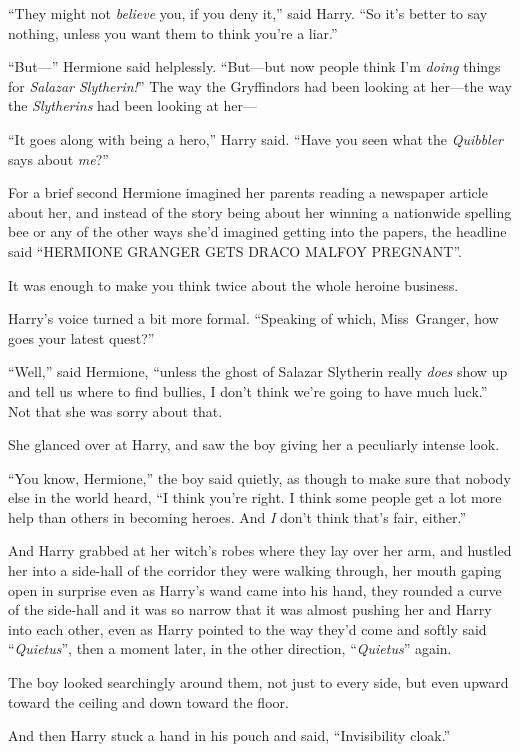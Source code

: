 “They might not \emph{believe} you, if you deny it,” said Harry. “So it’s better to say nothing, unless you want them to think you’re a liar.”

“But—” Hermione said helplessly. “But—but now people think I’m \emph{doing} things for \emph{Salazar Slytherin!}” The way the Gryffindors had been looking at her—the way the \emph{Slytherins} had been looking at her—

“It goes along with being a hero,” Harry said. “Have you seen what the \emph{Quibbler} says about \emph{me}?”

For a brief second Hermione imagined her parents reading a newspaper article about her, and instead of the story being about her winning a nationwide spelling bee or any of the other ways she’d imagined getting into the papers, the headline said “HERMIONE GRANGER GETS DRACO MALFOY PREGNANT”.

It was enough to make you think twice about the whole heroine business.

Harry’s voice turned a bit more formal. “Speaking of which, Miss~Granger, how goes your latest quest?”

“Well,” said Hermione, “unless the ghost of Salazar Slytherin really \emph{does} show up and tell us where to find bullies, I don’t think we’re going to have much luck.” Not that she was sorry about that.

She glanced over at Harry, and saw the boy giving her a peculiarly intense look.

“You know, Hermione,” the boy said quietly, as though to make sure that nobody else in the world heard, “I think you’re right. I think some people get a lot more help than others in becoming heroes. And \emph{I} don’t think that’s fair, either.”

And Harry grabbed at her witch’s robes where they lay over her arm, and hustled her into a side-hall of the corridor they were walking through, her mouth gaping open in surprise even as Harry’s wand came into his hand, they rounded a curve of the side-hall and it was so narrow that it was almost pushing her and Harry into each other, even as Harry pointed to the way they’d come and softly said “\emph{Quietus}”, then a moment later, in the other direction, “\emph{Quietus}” again.

The boy looked searchingly around them, not just to every side, but even upward toward the ceiling and down toward the floor.

And then Harry stuck a hand in his pouch and said, “Invisibility cloak.”

